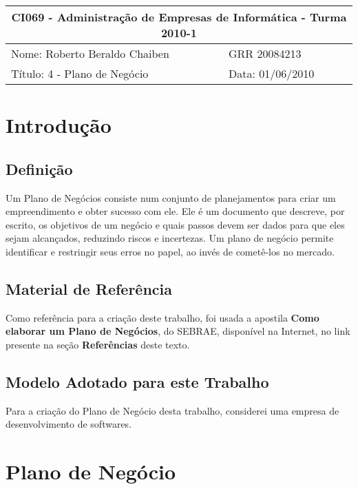 \documentclass[12pt]{article}
\begin{document}
\setlength{\parskip}{2ex}

\begin{tabular}[l]{ | p{10cm} | l | }
  \hline
  \multicolumn{2}{|c|}{CI069 - Administração de Empresas de Informática - Turma 2010-1} \\
  \hline
  Nome: Roberto Beraldo Chaiben & 
  GRR 20084213 \\
  \hline
  Título: 4 - Plano de Negócio &
  Data: 01/06/2010 \\
  \hline
\end{tabular}


\vspace{2cm}


\section{Introdução}

\subsection{Definição}

Um Plano de Negócios consiste num conjunto de planejamentos para criar um empreendimento e obter sucesso com ele.
Ele é um documento que descreve, por escrito, os objetivos de um negócio e quais passos devem ser dados para que
eles sejam alcançados, reduzindo riscos e incertezas. Um plano de negócio permite identificar e restringir seus
erros no papel, ao invés de cometê-los no mercado.

\subsection{Material de Referência}

Como referência para a criação deste trabalho, foi usada a apostila \textbf{Como elaborar um Plano de Negócios},
do SEBRAE, disponível na Internet, no link presente na seção \textbf{Referências} deste texto.

\subsection{Modelo Adotado para este Trabalho}

Para a criação do Plano de Negócio desta trabalho, considerei uma empresa de desenvolvimento de softwares.


\section{Plano de Negócio}
\end{document}
